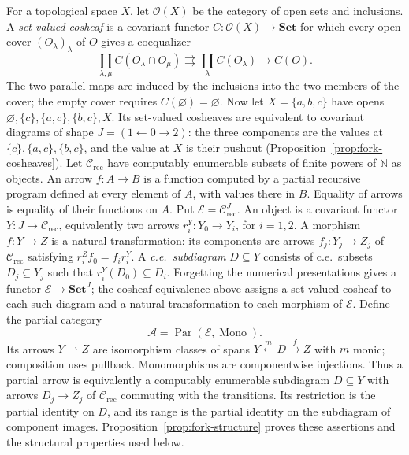 \documentclass[11pt]{article}
\newcommand{\N}{\mathbb N}
\begin{document}
For a topological space $X$, let $\mathcal O(X)$ be the category
of open sets and inclusions. A \emph{set-valued cosheaf} is a
covariant functor $C:\mathcal O(X)\to\mathbf{Set}$ for which
every open cover $(O_\lambda)_\lambda$ of $O$ gives a coequalizer
\[
 \coprod_{\lambda,\mu} C(O_\lambda\cap O_\mu)
 \rightrightarrows \coprod_\lambda C(O_\lambda)
 \longrightarrow C(O).
\]
The two parallel maps are induced by the inclusions into the two
members of the cover; the empty cover requires
$C(\varnothing)=\varnothing$.
Now let $X=\{a,b,c\}$ have opens
$\varnothing,\{c\},\{a,c\},\{b,c\},X$.
Its set-valued cosheaves are equivalent to covariant diagrams of shape
$J=(1\leftarrow0\to2)$: the three components are the values at
$\{c\},\{a,c\},\{b,c\}$, and the value at $X$ is their pushout
(Proposition~\ref{prop:fork-cosheaves}).
Let $\mathcal C_{\mathrm{rec}}$ have computably enumerable subsets
of finite powers of $\N$ as objects. An arrow $f:A\to B$ is a
function computed by a partial recursive program defined at every
element of $A$, with values there in $B$. Equality of arrows is
equality of their functions on $A$.
Put $\mathcal E=\mathcal C_{\mathrm{rec}}^J$.
An object is a covariant functor $Y:J\to\mathcal C_{\mathrm{rec}}$,
equivalently two arrows $r_i^Y:Y_0\to Y_i$, for $i=1,2$.
A morphism $f:Y\to Z$ is a natural transformation: its components
are arrows $f_j:Y_j\to Z_j$ of $\mathcal C_{\mathrm{rec}}$ satisfying
$r_i^Zf_0=f_i r_i^Y$.
A \emph{c.e.\ subdiagram} $D\subseteq Y$ consists of c.e.\ subsets
$D_j\subseteq Y_j$ such that $r_i^Y(D_0)\subseteq D_i$.
Forgetting the numerical presentations gives a functor
$\mathcal E\to\mathbf{Set}^J$; the cosheaf equivalence above assigns
a set-valued cosheaf to each such diagram and a natural transformation
to each morphism of $\mathcal E$.
Define the partial category
\[
 \mathcal A=\operatorname{Par}(\mathcal E,\operatorname{Mono}).
\]
Its arrows $Y\rightharpoonup Z$ are isomorphism classes of spans
$Y\xleftarrow{m}D\xrightarrow{f}Z$ with $m$ monic; composition
uses pullback. Monomorphisms are componentwise injections.
Thus a partial arrow is equivalently a computably enumerable
subdiagram $D\subseteq Y$ with arrows $D_j\to Z_j$ of
$\mathcal C_{\mathrm{rec}}$ commuting with the transitions. Its
restriction is the partial identity on $D$, and its range is the
partial identity on the subdiagram of component images.
Proposition~\ref{prop:fork-structure} proves these assertions and
the structural properties used below.
\end{document}
